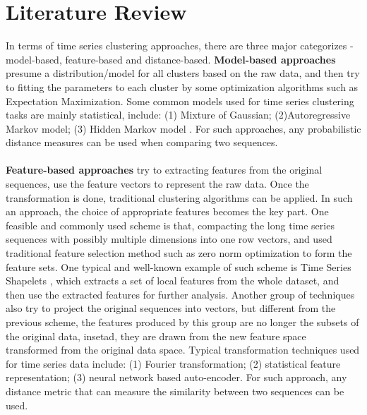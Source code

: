 \section{Literature Review}
In terms of time series clustering approaches, there are three major categorizes - model-based, feature-based and distance-based. \textbf{Model-based approaches} presume a distribution/model for all clusters based on the raw data, and then try to fitting the parameters to each cluster by some optimization algorithms such as Expectation Maximization. Some common models used for time series clustering tasks are mainly statistical, include: (1) Mixture of Gaussian; (2)Autoregressive Markov model; (3) Hidden Markov model \cite{nakano2019effect}. For such approaches, any probabilistic distance measures can be used when comparing two sequences.\\
\\\textbf{Feature-based approaches} try to extracting features from the original sequences, use the feature vectors to represent the raw data. Once the transformation is done, traditional clustering algorithms can be applied. In such an approach, the choice of appropriate features becomes the key part. One feasible and commonly used scheme is that, compacting the long time series sequences with possibly multiple dimensions into one row vectors, and used traditional feature selection method such as zero norm optimization \cite{chakraborty2007feature} to form the feature sets. One typical and well-known example of such scheme is Time Series Shapelets \cite{ye2009time}, which extracts a set of local features from the whole dataset, and then use the extracted features for further analysis. Another group of techniques also try to project the original sequences into vectors, but different from the previous scheme, the features produced by this group are no longer the subsets of the original data, insetad, they are drawn from the new feature space transformed from the original data space. Typical transformation techniques used for time series data include: (1) Fourier transformation; (2) statistical feature representation; (3) neural network based auto-encoder. For such approach, any distance metric that can measure the similarity between two sequences can be used.\\
